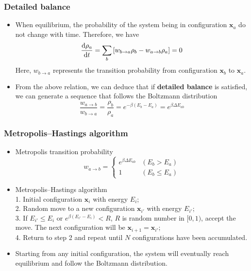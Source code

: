 \documentclass[10pt,t]{beamer}
\begin{document}
{
\begin{frame}
\frametitle{Detailed balance}
\begin{itemize}
\vspace{-0.6em}
\setlength\itemsep{1em}
    \item When equilibrium, the probability of the system being in configuration $\mathbf{x}_a$ do \\ not change with time. Therefore, we have
$$
\dv{\rho_a}{t} = \sum_b \left[ w_{b \to a} \rho_b - w_{a \to b} \rho_a \right] = 0
$$
Here, $w_{b \to a}$ represents the transition probability from configuration $\mathbf{x}_b$ to $\mathbf{x}_a$. 

\item From the above relation, we can deduce that if \textbf{detailed balance} is satisfied,\\ we can generate a sequence that follows the Boltzmann distribution
$$
\frac{w_{a \to b}}{w_{b \to a}} = \frac{\rho_b}{\rho_a} = e^{-\beta (E_b - E_a)} = e^{\beta \Delta E_{ab}}
$$
\end{itemize}
\end{frame}
}

{
\begin{frame}
\frametitle{Metropolis–Hastings algorithm}
\begin{itemize}
\vspace{-0.6em}
\setlength\itemsep{1em}
    \item Metropolis transition probability
$$\left.w_{a\to b}=\left\{\begin{array}{cc}e^{\beta\Delta E_{ab}}&(E_b>E_a)\\1&(E_b\leq E_a)\end{array}\right.\right.$$

\item Metropolis–Hastings algorithm \\
1. Initial configuration $\mathbf{x}_{i}$ with energy $E_{i}$;\\
2. Random move to a new configuration $\mathbf{x}_{i'}$ with energy $E_{i'}$;\\
3. If $E_{i'}\leq E_{i}$ or $e^{\beta (E_{i'}-E_{i})} < R$, $R$ is random number in $[0,1)$, accept the move. The next configuration will be $\mathbf{x}_{i+1} = \mathbf{x}_{i'}$;\\
4. Return to step 2 and repeat until $N$ configurations have been accumulated.\\

\item Starting from any initial configuration, the system will eventually reach equilibrium and follow the Boltzmann distribution. 
\end{itemize}
\end{frame}
}
\end{document}
